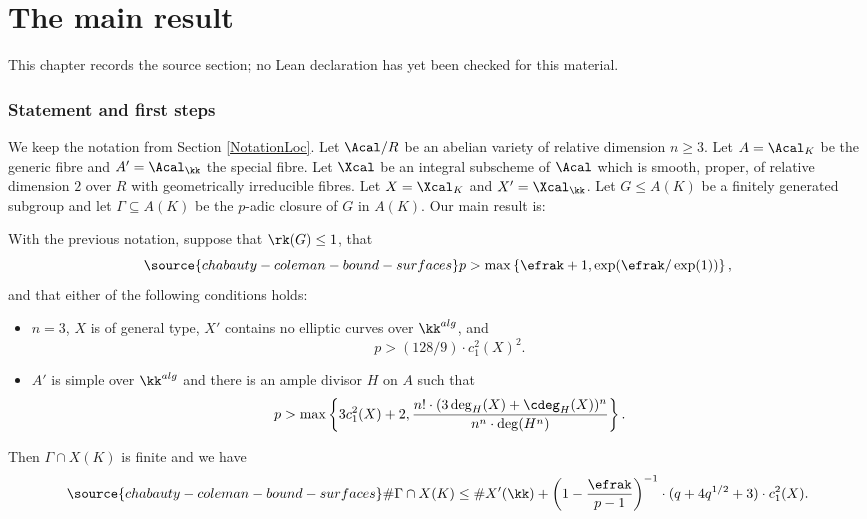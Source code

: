 \chapter{The main result}
\label{chabauty-coleman-bound-surfaces-chapter-09}

\begin{remark}
\label{chabauty-coleman-bound-surfaces-chapter-09-source}
This chapter records the source section; no Lean declaration has yet been checked for this material.
\notready
\end{remark}

\label{SecMainResult}

\subsection{Statement and first steps} We keep the notation from Section \ref{NotationLoc}. Let $\Acal/R$ be an abelian variety of relative dimension $n\ge 3$. Let $A=\Acal_K$ be the generic fibre and $A'=\Acal_\kk$ the special fibre. Let $\Xcal$ be an integral subscheme of $\Acal$ which is smooth, proper, of relative dimension $2$ over $R$ with geometrically irreducible fibres. Let $X=\Xcal_K$ and $X'=\Xcal_\kk$. Let $G\le A(K)$ be a finitely generated subgroup and let $\Gamma\subseteq A(K)$ be the $p$-adic closure of $G$ in $A(K)$. Our main result is:

\begin{theorem}
\notready\label{ThmMain} With the previous notation, suppose that $\rk (G)\le 1$, that
\begin{equation}\label{Eqnplarge}
\source{chabauty-coleman-bound-surfaces}
p>\max\left\{\efrak+1, \exp(\efrak/\exp(1))\right\} ,
\end{equation}
and that either of the following conditions holds:
\begin{itemize}
\item[(i)] $n=3$, $X$ is of general type, $X'$ contains no elliptic curves over $\kk^{alg}$, and
$$
p> (128/9)\cdot c_1^2(X)^2.
$$
\item[(ii)] $A'$ is simple over $\kk^{alg}$ and there is an ample divisor $H$ on $A$ such that
$$
p> \max\left\{3 c_1^2(X)+2,\frac{n!\cdot (3\deg_H(X) + \cdeg_H(X))^n}{n^n\cdot \deg(H^n)}\right\}.
$$
\end{itemize}
Then $\Gamma\cap X(K)$ is finite and we have
\begin{equation}\label{EqnMainBound}
\source{chabauty-coleman-bound-surfaces}
\# \Gamma\cap X(K) \le \# X'(\kk) + \left(1-\frac{\efrak}{p-1}\right)^{-1}\cdot (q+4q^{1/2}+3)\cdot c_1^2(X).
\end{equation}
\end{theorem}



